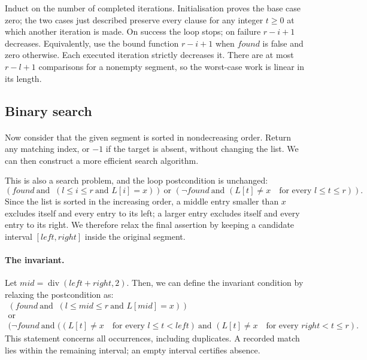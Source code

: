 Induct on the number of completed iterations. Initialisation proves the
base case zero; the two cases just described preserve every clause for
any integer $t\geq0$ at which another iteration is made. On success the
loop stops; on failure $r-i+1$ decreases. Equivalently, use the bound function
$r-i+1$ when $found$ is false and zero otherwise. Each executed iteration
strictly decreases it. There are at most $r-l+1$ comparisons for a nonempty
segment, so the worst-case work is linear in its length.

\subsection{Binary search}
\label{sec:imp-binary-search}

\paragraph{}
Now consider that the given segment is sorted in nondecreasing order. Return any matching
index, or $-1$ if the target is absent, without changing the list. We can then construct a more efficient search algorithm.

This is also a search problem, and the loop postcondition is unchanged: 
\[
(found\ \text{and }\ (l\leq i\leq r\ \text{and }L[i]=x))\ \text{or } (\neg found\ \text{and } (L[t]\ne x\quad\text{for every }l\leq t \leq r)).
\]
 Since the list is sorted in the increasing order, 
a middle entry smaller than $x$ excludes itself and every entry to its
left; a larger entry excludes itself and every entry to its right.
We therefore relax the final assertion by keeping a candidate interval
$[left,right]$ inside the original segment.

\paragraph{The invariant.}
Let $mid = \operatorname{div}(left+right,2)$. Then, we can define the invariant condition by relaxing the postcondition as:
\[
\begin{gathered}
(found\ \text{and }\ (l\leq mid\leq r\ \text{and }L[mid]=x))\\
\text{or } \\
(\neg found\ \text{and } ((L[t]\ne x\quad\text{for every }l\leq t< left)\ \text{and } (L[t]\ne x\quad\text{for every }right <  t \leq r).
\end{gathered}
\]
This statement concerns all occurrences, including duplicates. A recorded
match lies within the remaining interval; an empty interval certifies absence.

